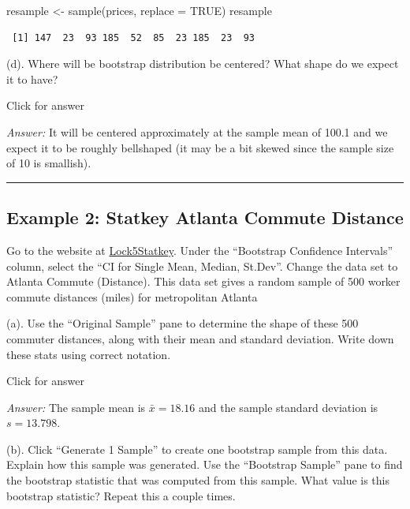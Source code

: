 \documentclass[
]{book}
\newenvironment{Shaded}{\begin{snugshade}}{\end{snugshade}}
\newcommand{\AttributeTok}[1]{\textcolor[rgb]{0.77,0.63,0.00}{#1}}
\newcommand{\ConstantTok}[1]{\textcolor[rgb]{0.00,0.00,0.00}{#1}}
\newcommand{\FunctionTok}[1]{\textcolor[rgb]{0.00,0.00,0.00}{#1}}
\newcommand{\NormalTok}[1]{#1}
\newcommand{\OtherTok}[1]{\textcolor[rgb]{0.56,0.35,0.01}{#1}}
\begin{document}
\begin{Shaded}
\begin{Highlighting}[]
\NormalTok{resample }\OtherTok{\textless{}{-}} \FunctionTok{sample}\NormalTok{(prices, }\AttributeTok{replace =} \ConstantTok{TRUE}\NormalTok{)}
\NormalTok{resample}
\end{Highlighting}
\end{Shaded}

\begin{verbatim}
 [1] 147  23  93 185  52  85  23 185  23  93
\end{verbatim}

(d). Where will be bootstrap distribution be centered? What shape do we expect it to have?

Click for answer

\emph{Answer:} It will be centered approximately at the sample mean of 100.1 and we expect it to be roughly bellshaped (it may be a bit skewed since the sample size of 10 is smallish).

\begin{center}\rule{0.5\linewidth}{0.5pt}\end{center}

\hypertarget{example-2-statkey-atlanta-commute-distance}{%
\subsection{Example 2: Statkey Atlanta Commute Distance}\label{example-2-statkey-atlanta-commute-distance}}

Go to the website at \href{http://www.lock5stat.com/StatKey/}{Lock5Statkey}. Under the ``Bootstrap Confidence Intervals'' column, select the ``CI for Single Mean, Median, St.Dev''. Change the data set to Atlanta Commute (Distance). This data set gives a random sample of 500 worker commute distances (miles) for metropolitan Atlanta

(a). Use the ``Original Sample'' pane to determine the shape of these 500 commuter distances, along with their mean and standard deviation. Write down these stats using correct notation.

Click for answer

\emph{Answer:} The sample mean is \(\bar{x} = 18.16\) and the sample standard deviation is \(s = 13.798\).

(b). Click ``Generate 1 Sample'' to create one bootstrap sample from this data. Explain how this sample was generated. Use the ``Bootstrap Sample'' pane to find the bootstrap statistic that was computed from this sample. What value is this bootstrap statistic? Repeat this a couple times.
\end{document}
